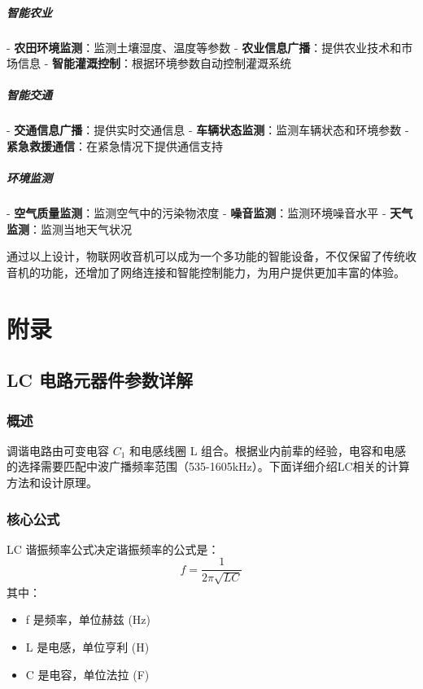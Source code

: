 \documentclass[12pt,UTF8]{ctexbook}
\begin{document}
\subsubsection{智能农业}
- \textbf{农田环境监测}：监测土壤湿度、温度等参数
- \textbf{农业信息广播}：提供农业技术和市场信息
- \textbf{智能灌溉控制}：根据环境参数自动控制灌溉系统

\subsubsection{智能交通}
- \textbf{交通信息广播}：提供实时交通信息
- \textbf{车辆状态监测}：监测车辆状态和环境参数
- \textbf{紧急救援通信}：在紧急情况下提供通信支持

\subsubsection{环境监测}
- \textbf{空气质量监测}：监测空气中的污染物浓度
- \textbf{噪音监测}：监测环境噪音水平
- \textbf{天气监测}：监测当地天气状况

通过以上设计，物联网收音机可以成为一个多功能的智能设备，不仅保留了传统收音机的功能，还增加了网络连接和智能控制能力，为用户提供更加丰富的体验。

\backmatter

\part{附录}

\chapter{LC 电路元器件参数详解}

\section{概述}

调谐电路由可变电容 $C_1$ 和电感线圈 L 组合。根据业内前辈的经验，电容和电感的选择需要匹配中波广播频率范围（535-1605kHz）。下面详细介绍LC相关的计算方法和设计原理。

\section{核心公式}

LC 谐振频率公式决定谐振频率的公式是：
\[ f=\frac{1}{2\pi\sqrt{LC}} \]
其中：
\begin{itemize}
  \item f 是频率，单位赫兹 (Hz)
  \item L 是电感，单位亨利 (H)
  \item C 是电容，单位法拉 (F)
\end{itemize}
\end{document}
